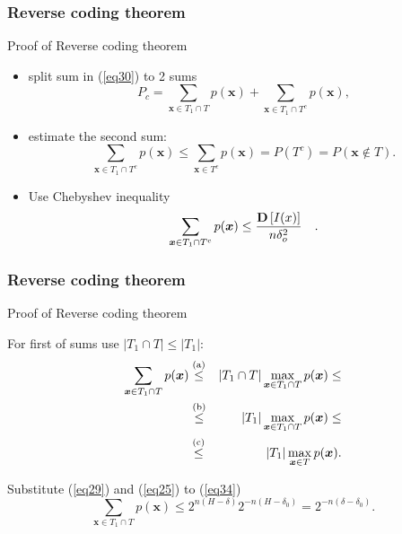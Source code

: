 \documentclass[14pt]{beamer}
\renewcommand{\vec}[1]{\ensuremath{\boldsymbol{#1}}}
\begin{document}
\begin{frame}
\frametitle{Reverse coding theorem}
Proof of Reverse coding theorem
\begin{itemize}
    
    \item split sum in (\ref{eq30}) to 2 sums
    \begin{equation}
    \label{eq32} P_c = \sum\limits_{\vec x \in T_1 \cap T} {p(\vec x)}
    + \sum\limits_{\vec x \in T_1 \cap T^c} {p(\vec x),}
    \end{equation}
    
    \item estimate the second sum:
    \[
    \sum\limits_{\vec x \in T_1 \cap T^c} {p(\vec x)} \le
    \sum\limits_{\vec x \in T^c} {p(\vec x) = } P(T^c) = P(\vec x
    \notin T).
    \]
    

    \item Use Chebyshev inequality
    \begin{equation}
    \label{eq33} \sum\limits_{\vec x \in T_1 \cap T^c} {p(\vec x)} \le
    \frac{{\rm {\bf D}}\left[ {I(x)} \right]}{n\delta _o^2 } \quad .
    \end{equation}

\end{itemize}
\end{frame}


\begin{frame}
\frametitle{Reverse coding theorem}
Proof of Reverse coding theorem
\begin{itemize}
\small{

    \item For first of sums use $\left| {T_1 \cap T} \right| \le \left| {T_1 }\right|$:
    \begin{eqnarray}
    \sum\limits_{\vec x \in T_1 \cap T} {p(\vec x)} %
    &\stackrel{\rm (a)}{\le} & \vert T_1 \cap T\vert \mathop {\max
    }\limits_{\vec x \in T_1 \cap T} p(\vec
    x) \le \nonumber \\
    &\stackrel{\rm (b)}{\le}&
     \vert T_1 \vert \mathop {\max }\limits_{\vec x \in T_1 \cap
    T} p(\vec x)\le \nonumber \\
    &\stackrel{\rm (c)}{\le}& \label{eq34}  \vert T_1 \vert \mathop
    {\max }\limits_{\vec x \in T} p(\vec x).
    \end{eqnarray}
    
    \item Substitute (\ref{eq29}) and (\ref{eq25}) to (\ref{eq34})
    \begin{equation}
    \label{eq35} \sum\limits_{\vec x \in T_1 \cap T} {p(\vec x)} \le
    2^{n(H - \delta )}2^{ - n(H - \delta _0 )} = 2^{ - n(\delta -
    \delta _0 )}.
    \end{equation}
}

\end{itemize}
\end{frame}
\end{document}
